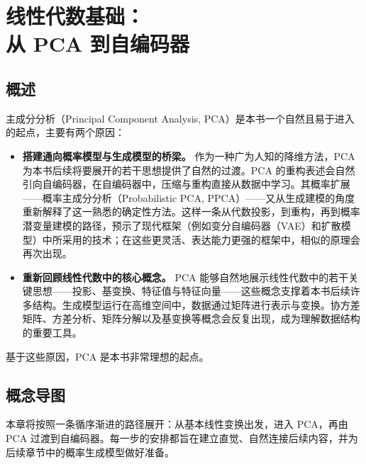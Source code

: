 \chapter[线性代数基础：从 PCA 到自编码器]{线性代数基础：\\从 PCA 到自编码器}
\section*{概述}

主成分分析（Principal Component Analysis, PCA）是本书一个自然且易于进入的起点，主要有两个原因：
\begin{itemize}
   \item \textbf{搭建通向概率模型与生成模型的桥梁。}
    作为一种广为人知的降维方法，PCA 为本书后续将要展开的若干思想提供了自然的过渡。PCA 的重构表述会自然引向自编码器，在自编码器中，压缩与重构直接从数据中学习。其概率扩展——概率主成分分析（Probabilistic PCA, PPCA）——又从生成建模的角度重新解释了这一熟悉的确定性方法。这样一条从代数投影，到重构，再到概率潜变量建模的路径，预示了现代框架（例如变分自编码器（VAE）和扩散模型）中所采用的技术；在这些更灵活、表达能力更强的框架中，相似的原理会再次出现。

    \item \textbf{重新回顾线性代数中的核心概念。}  
    PCA 能够自然地展示线性代数中的若干关键思想——投影、基变换、特征值与特征向量——这些概念支撑着本书后续许多结构。生成模型运行在高维空间中，数据通过矩阵进行表示与变换。协方差矩阵、方差分析、矩阵分解以及基变换等概念会反复出现，成为理解数据结构的重要工具。
\end{itemize}

基于这些原因，PCA 是本书非常理想的起点。

\section*{概念导图}

本章将按照一条循序渐进的路径展开：从基本线性变换出发，进入 PCA，再由 PCA 过渡到自编码器。每一步的安排都旨在建立直觉、自然连接后续内容，并为后续章节中的概率生成模型做好准备。

